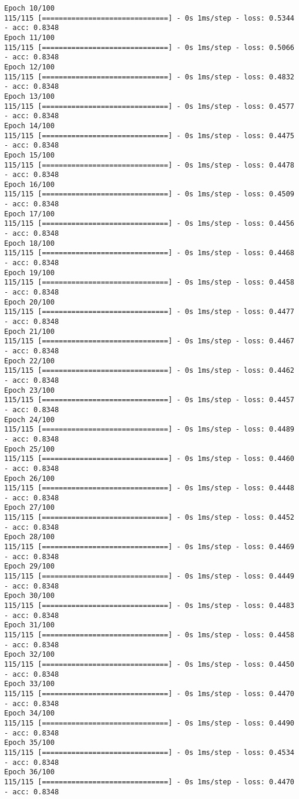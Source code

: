 \documentclass[11pt]{article}
\begin{document}
\begin{Verbatim}[commandchars=\\\{\}]
Epoch 10/100
115/115 [==============================] - 0s 1ms/step - loss: 0.5344 - acc: 0.8348
Epoch 11/100
115/115 [==============================] - 0s 1ms/step - loss: 0.5066 - acc: 0.8348
Epoch 12/100
115/115 [==============================] - 0s 1ms/step - loss: 0.4832 - acc: 0.8348
Epoch 13/100
115/115 [==============================] - 0s 1ms/step - loss: 0.4577 - acc: 0.8348
Epoch 14/100
115/115 [==============================] - 0s 1ms/step - loss: 0.4475 - acc: 0.8348
Epoch 15/100
115/115 [==============================] - 0s 1ms/step - loss: 0.4478 - acc: 0.8348
Epoch 16/100
115/115 [==============================] - 0s 1ms/step - loss: 0.4509 - acc: 0.8348
Epoch 17/100
115/115 [==============================] - 0s 1ms/step - loss: 0.4456 - acc: 0.8348
Epoch 18/100
115/115 [==============================] - 0s 1ms/step - loss: 0.4468 - acc: 0.8348
Epoch 19/100
115/115 [==============================] - 0s 1ms/step - loss: 0.4458 - acc: 0.8348
Epoch 20/100
115/115 [==============================] - 0s 1ms/step - loss: 0.4477 - acc: 0.8348
Epoch 21/100
115/115 [==============================] - 0s 1ms/step - loss: 0.4467 - acc: 0.8348
Epoch 22/100
115/115 [==============================] - 0s 1ms/step - loss: 0.4462 - acc: 0.8348
Epoch 23/100
115/115 [==============================] - 0s 1ms/step - loss: 0.4457 - acc: 0.8348
Epoch 24/100
115/115 [==============================] - 0s 1ms/step - loss: 0.4489 - acc: 0.8348
Epoch 25/100
115/115 [==============================] - 0s 1ms/step - loss: 0.4460 - acc: 0.8348
Epoch 26/100
115/115 [==============================] - 0s 1ms/step - loss: 0.4448 - acc: 0.8348
Epoch 27/100
115/115 [==============================] - 0s 1ms/step - loss: 0.4452 - acc: 0.8348
Epoch 28/100
115/115 [==============================] - 0s 1ms/step - loss: 0.4469 - acc: 0.8348
Epoch 29/100
115/115 [==============================] - 0s 1ms/step - loss: 0.4449 - acc: 0.8348
Epoch 30/100
115/115 [==============================] - 0s 1ms/step - loss: 0.4483 - acc: 0.8348
Epoch 31/100
115/115 [==============================] - 0s 1ms/step - loss: 0.4458 - acc: 0.8348
Epoch 32/100
115/115 [==============================] - 0s 1ms/step - loss: 0.4450 - acc: 0.8348
Epoch 33/100
115/115 [==============================] - 0s 1ms/step - loss: 0.4470 - acc: 0.8348
Epoch 34/100
115/115 [==============================] - 0s 1ms/step - loss: 0.4490 - acc: 0.8348
Epoch 35/100
115/115 [==============================] - 0s 1ms/step - loss: 0.4534 - acc: 0.8348
Epoch 36/100
115/115 [==============================] - 0s 1ms/step - loss: 0.4470 - acc: 0.8348

\end{Verbatim}
\end{document}
